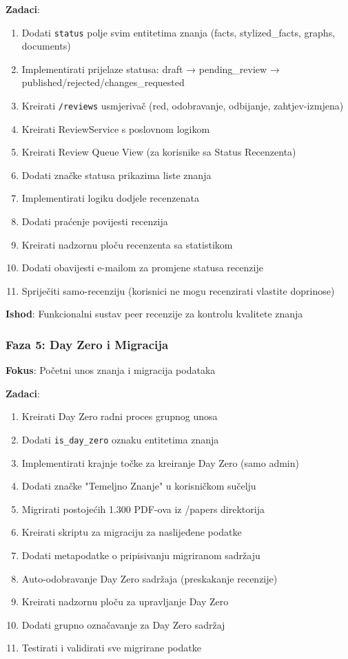 \documentclass[12pt,a4paper]{article}
\begin{document}
\textbf{Zadaci}:
\begin{enumerate}
    \item Dodati \texttt{status} polje svim entitetima znanja (facts, stylized\_facts, graphs, documents)
    \item Implementirati prijelaze statusa: draft → pending\_review → published/rejected/changes\_requested
    \item Kreirati \texttt{/reviews} usmjerivač (red, odobravanje, odbijanje, zahtjev-izmjena)
    \item Kreirati ReviewService s poslovnom logikom
    \item Kreirati Review Queue View (za korisnike sa Status Recenzenta)
    \item Dodati značke statusa prikazima liste znanja
    \item Implementirati logiku dodjele recenzenata
    \item Dodati praćenje povijesti recenzija
    \item Kreirati nadzornu ploču recenzenta sa statistikom
    \item Dodati obavijesti e-mailom za promjene statusa recenzije
    \item Spriječiti samo-recenziju (korisnici ne mogu recenzirati vlastite doprinose)
\end{enumerate}

\textbf{Ishod}: Funkcionalni sustav peer recenzije za kontrolu kvalitete znanja

\subsubsection{Faza 5: Day Zero i Migracija}
\textbf{Fokus}: Početni unos znanja i migracija podataka

\textbf{Zadaci}:
\begin{enumerate}
    \item Kreirati Day Zero radni proces grupnog unosa
    \item Dodati \texttt{is\_day\_zero} oznaku entitetima znanja
    \item Implementirati krajnje točke za kreiranje Day Zero (samo admin)
    \item Dodati značke "Temeljno Znanje" u korisničkom sučelju
    \item Migrirati postojećih 1.300 PDF-ova iz /papers direktorija
    \item Kreirati skriptu za migraciju za naslijeđene podatke
    \item Dodati metapodatke o pripisivanju migriranom sadržaju
    \item Auto-odobravanje Day Zero sadržaja (preskakanje recenzije)
    \item Kreirati nadzornu ploču za upravljanje Day Zero
    \item Dodati grupno označavanje za Day Zero sadržaj
    \item Testirati i validirati sve migrirane podatke
\end{enumerate}
\end{document}
